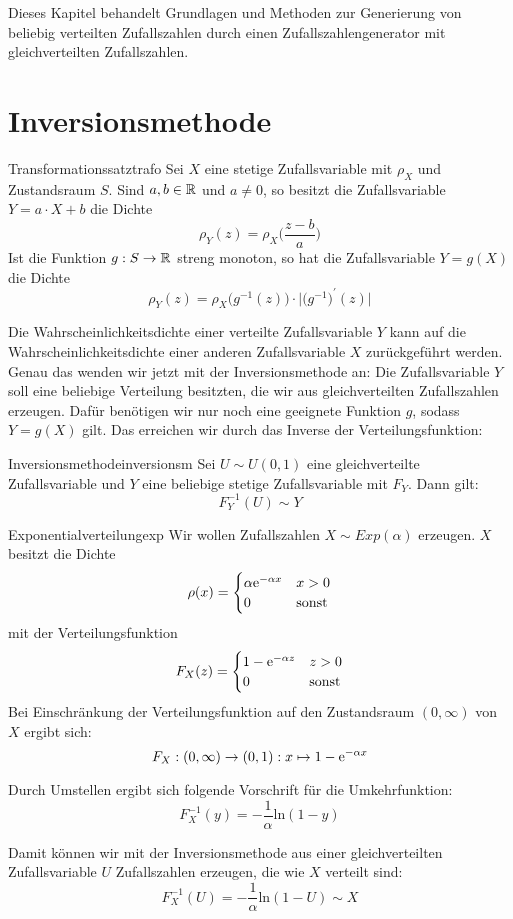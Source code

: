 Dieses Kapitel behandelt Grundlagen und Methoden zur Generierung von beliebig
verteilten Zufallszahlen durch einen Zufallszahlengenerator mit gleichverteilten
Zufallszahlen.

\section{Inversionsmethode}

\begin{theorem}{Transformationssatz}{trafo}
Sei $X$ eine stetige Zufallsvariable mit  $\rho_X$ und
Zustandsraum $S$. Sind $a,b\in\mathbb{R}$ und $a \ne 0$, so besitzt die Zufallsvariable
$Y = a\cdot X + b$ die Dichte
\[\rho_Y(z) = \rho_X\Big(\frac{z-b}{a}\Big)\]
Ist die Funktion $g:S\to\mathbb{R}$ streng monoton, so hat die Zufallsvariable $Y=g(X)$
die Dichte
\[\rho_Y(z) = \rho_X\big(g^{-1}(z)\big)\cdot\big|\big(g^{-1}\big)^\prime(z)\big|\]
\end{theorem}

Die Wahrscheinlichkeitsdichte einer verteilte Zufallsvariable $Y$ kann auf die
Wahrscheinlichkeitsdichte einer anderen Zufallsvariable $X$ zurückgeführt
werden. Genau das wenden wir jetzt mit der Inversionsmethode an: Die
Zufallsvariable $Y$ soll eine beliebige Verteilung besitzten, die wir aus
gleichverteilten Zufallszahlen erzeugen. Dafür benötigen wir nur noch eine
geeignete Funktion $g$, sodass $Y=g(X)$ gilt. Das erreichen wir durch das
Inverse der Verteilungsfunktion:

\begin{theorem}{Inversionsmethode}{inversionsm}
Sei $U\sim U(0,1)$ eine gleichverteilte Zufallsvariable und $Y$ eine
beliebige stetige Zufallsvariable mit 
$F_Y$. Dann gilt:
\[F_Y^{-1}(U) \sim Y\]
\end{theorem}

\begin{example}{Exponentialverteilung}{exp}
Wir wollen Zufallszahlen $X\sim Exp(\alpha)$ erzeugen. $X$ besitzt die Dichte
\[
\rho(x) = \begin{cases}
\alpha \mathrm{e}^{-\alpha x} & x > 0 \\
0 & \text{sonst}
\end{cases}
\]
mit der Verteilungsfunktion
\[
F_X(z) = \begin{cases}
1- \mathrm{e}^{-\alpha z} & z > 0 \\
0 & \text{sonst}
\end{cases}
\]
Bei Einschränkung der Verteilungsfunktion auf den Zustandsraum $(0, \infty)$ von
$X$ ergibt sich:
\[F_X: (0,\infty)\to(0,1):x\mapsto1-\mathrm{e}^{-\alpha x}\]

Durch Umstellen ergibt sich folgende Vorschrift für die Umkehrfunktion:
\[F_X^{-1}(y) = -\frac{1}{\alpha} \mathrm{ln}(1-y)\]

Damit können wir mit der Inversionsmethode aus einer gleichverteilten
Zufallsvariable $U$ Zufallszahlen erzeugen, die wie $X$ verteilt sind:
\[F_X^{-1}(U) = -\frac{1}{\alpha} \mathrm{ln}(1-U) \sim X\]

\end{example}

